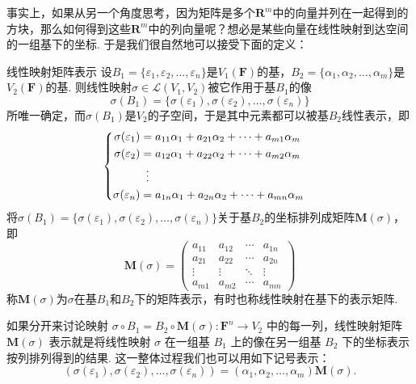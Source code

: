 事实上，如果从另一个角度思考，因为矩阵是多个$\mathbf{R}^m$中的向量并列在一起得到的方块，那么如何得到这些$\mathbf{R}^m$中的列向量呢？想必是某些向量在线性映射到达空间的一组基下的坐标. 于是我们很自然地可以接受下面的定义：
\begin{definition}{}{线性映射矩阵表示}
    设$B_1=\{\varepsilon_1,\varepsilon_2,\ldots,\varepsilon_n\}$是$V_1(\mathbf{F})$的基，$B_2=\{\alpha_1,\alpha_2,\ldots,\alpha_m\}$是$V_2(\mathbf{F})$的基. 则线性映射$\sigma \in \mathcal{L}(V_1,V_2)$被它作用于基$B_1$的像
    \[\sigma(B_1)=\{\sigma(\varepsilon_1),\sigma(\varepsilon_2),\ldots,\sigma(\varepsilon_n)\}\]
    所唯一确定，而$\sigma(B_1)$是$V_2$的子空间，于是其中元素都可以被基$B_2$线性表示，即
    \[ \begin{cases} \begin{aligned}
                \sigma(\varepsilon_1) & = a_{11}\alpha_1+a_{21}\alpha_2+\cdots+a_{m1}\alpha_m \\
                \sigma(\varepsilon_2) & = a_{12}\alpha_1+a_{22}\alpha_2+\cdots+a_{m2}\alpha_m \\
                                      & \vdotswithin{=}                                       \\
                \sigma(\varepsilon_n) & = a_{1n}\alpha_1+a_{2n}\alpha_2+\cdots+a_{mn}\alpha_m
            \end{aligned} \end{cases} \]
    将$\sigma(B_1)=\{\sigma(\varepsilon_1),\sigma(\varepsilon_2),\ldots,\sigma(\varepsilon_n)\}$关于基$B_2$的坐标排列成矩阵$\mathbf{M}(\sigma)$，即
    \[\mathbf{M}(\sigma)=\begin{pmatrix}
            a_{11} & a_{12} & \cdots & a_{1n} \\
            a_{21} & a_{22} & \cdots & a_{2n} \\
            \vdots & \vdots & \ddots & \vdots \\
            a_{m1} & a_{m2} & \cdots & a_{mn}
        \end{pmatrix}\]
    称$\mathbf{M}(\sigma)$为$\sigma$在基$B_1$和$B_2$下的矩阵表示，有时也称线性映射在基下的表示矩阵.
\end{definition}

如果分开来讨论映射 $\sigma \circ B_1 = B_2 \circ \mathbf{M}(\sigma) : \mathbf{F}^n\to V_2$ 中的每一列，线性映射矩阵 $\mathbf{M}(\sigma)$ 表示就是将线性映射 $\sigma$ 在一组基 $B_1$ 上的像在另一组基 $B_2$ 下的坐标表示按列排列得到的结果. 这一整体过程我们也可以用如下记号表示：
\begin{equation}\label{eq:7:线性映射矩阵表示}
    (\sigma(\varepsilon_1),\sigma(\varepsilon_2),\ldots,\sigma(\varepsilon_n))=(\alpha_1,\alpha_2,\ldots,\alpha_m)\mathbf{M}(\sigma).
\end{equation}

